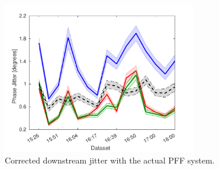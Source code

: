 \begin{figure}
  \centering
  \includegraphics[width=0.75\textwidth]{Figures/feedforward/longFF_jitDatSet}
  \caption{Corrected downstream jitter with the actual PFF system.}
  \label{f:longFF_jitDatSet}
\end{figure}

